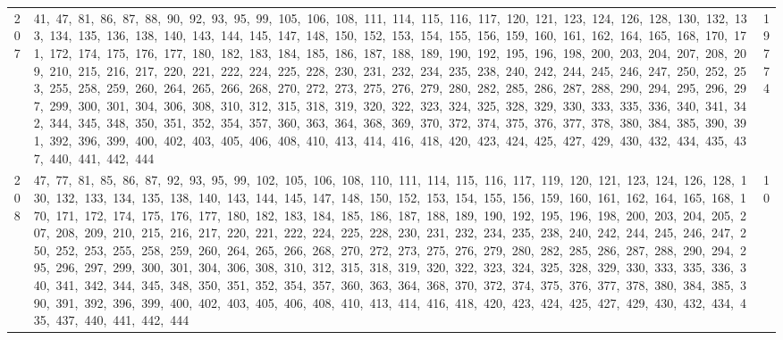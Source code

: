 \begin{longtable}{c|p{}|r}
207 & 41,\ 47,\ 81,\ 86,\ 87,\ 88,\ 90,\ 92,\ 93,\ 95,\ 99,\ 105,\ 106,\ 108,\ 111,\ 114,\ 115,\ 116,\ 117,\ 120,\ 121,\ 123,\ 124,\ 126,\ 128,\ 130,\ 132,\ 133,\ 134,\ 135,\ 136,\ 138,\ 140,\ 143,\ 144,\ 145,\ 147,\ 148,\ 150,\ 152,\ 153,\ 154,\ 155,\ 156,\ 159,\ 160,\ 161,\ 162,\ 164,\ 165,\ 168,\ 170,\ 171,\ 172,\ 174,\ 175,\ 176,\ 177,\ 180,\ 182,\ 183,\ 184,\ 185,\ 186,\ 187,\ 188,\ 189,\ 190,\ 192,\ 195,\ 196,\ 198,\ 200,\ 203,\ 204,\ 207,\ 208,\ 209,\ 210,\ 215,\ 216,\ 217,\ 220,\ 221,\ 222,\ 224,\ 225,\ 228,\ 230,\ 231,\ 232,\ 234,\ 235,\ 238,\ 240,\ 242,\ 244,\ 245,\ 246,\ 247,\ 250,\ 252,\ 253,\ 255,\ 258,\ 259,\ 260,\ 264,\ 265,\ 266,\ 268,\ 270,\ 272,\ 273,\ 275,\ 276,\ 279,\ 280,\ 282,\ 285,\ 286,\ 287,\ 288,\ 290,\ 294,\ 295,\ 296,\ 297,\ 299,\ 300,\ 301,\ 304,\ 306,\ 308,\ 310,\ 312,\ 315,\ 318,\ 319,\ 320,\ 322,\ 323,\ 324,\ 325,\ 328,\ 329,\ 330,\ 333,\ 335,\ 336,\ 340,\ 341,\ 342,\ 344,\ 345,\ 348,\ 350,\ 351,\ 352,\ 354,\ 357,\ 360,\ 363,\ 364,\ 368,\ 369,\ 370,\ 372,\ 374,\ 375,\ 376,\ 377,\ 378,\ 380,\ 384,\ 385,\ 390,\ 391,\ 392,\ 396,\ 399,\ 400,\ 402,\ 403,\ 405,\ 406,\ 408,\ 410,\ 413,\ 414,\ 416,\ 418,\ 420,\ 423,\ 424,\ 425,\ 427,\ 429,\ 430,\ 432,\ 434,\ 435,\ 437,\ 440,\ 441,\ 442,\ 444 & 19774 \\
208 & 47,\ 77,\ 81,\ 85,\ 86,\ 87,\ 92,\ 93,\ 95,\ 99,\ 102,\ 105,\ 106,\ 108,\ 110,\ 111,\ 114,\ 115,\ 116,\ 117,\ 119,\ 120,\ 121,\ 123,\ 124,\ 126,\ 128,\ 130,\ 132,\ 133,\ 134,\ 135,\ 138,\ 140,\ 143,\ 144,\ 145,\ 147,\ 148,\ 150,\ 152,\ 153,\ 154,\ 155,\ 156,\ 159,\ 160,\ 161,\ 162,\ 164,\ 165,\ 168,\ 170,\ 171,\ 172,\ 174,\ 175,\ 176,\ 177,\ 180,\ 182,\ 183,\ 184,\ 185,\ 186,\ 187,\ 188,\ 189,\ 190,\ 192,\ 195,\ 196,\ 198,\ 200,\ 203,\ 204,\ 205,\ 207,\ 208,\ 209,\ 210,\ 215,\ 216,\ 217,\ 220,\ 221,\ 222,\ 224,\ 225,\ 228,\ 230,\ 231,\ 232,\ 234,\ 235,\ 238,\ 240,\ 242,\ 244,\ 245,\ 246,\ 247,\ 250,\ 252,\ 253,\ 255,\ 258,\ 259,\ 260,\ 264,\ 265,\ 266,\ 268,\ 270,\ 272,\ 273,\ 275,\ 276,\ 279,\ 280,\ 282,\ 285,\ 286,\ 287,\ 288,\ 290,\ 294,\ 295,\ 296,\ 297,\ 299,\ 300,\ 301,\ 304,\ 306,\ 308,\ 310,\ 312,\ 315,\ 318,\ 319,\ 320,\ 322,\ 323,\ 324,\ 325,\ 328,\ 329,\ 330,\ 333,\ 335,\ 336,\ 340,\ 341,\ 342,\ 344,\ 345,\ 348,\ 350,\ 351,\ 352,\ 354,\ 357,\ 360,\ 363,\ 364,\ 368,\ 370,\ 372,\ 374,\ 375,\ 376,\ 377,\ 378,\ 380,\ 384,\ 385,\ 390,\ 391,\ 392,\ 396,\ 399,\ 400,\ 402,\ 403,\ 405,\ 406,\ 408,\ 410,\ 413,\ 414,\ 416,\ 418,\ 420,\ 423,\ 424,\ 425,\ 427,\ 429,\ 430,\ 432,\ 434,\ 435,\ 437,\ 440,\ 441,\ 442,\ 444 & 10 \\

\end{longtable}

